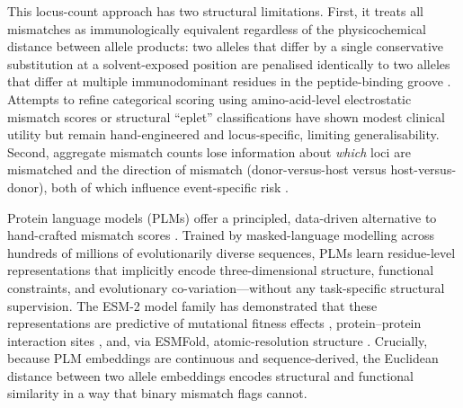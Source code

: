 \documentclass[11pt,a4paper]{article}
\begin{document}
This locus-count approach has two structural limitations.  First, it treats
all mismatches as immunologically equivalent regardless of the physicochemical
distance between allele products: two alleles that differ by a single
conservative substitution at a solvent-exposed position are penalised
identically to two alleles that differ at multiple immunodominant residues in
the peptide-binding groove \citep{buhler2016hla, petersdorf2015hladp,
fleischhauer2012hla}.  Attempts to refine categorical scoring using
amino-acid-level electrostatic mismatch scores \citep{spellman2012permissive}
or structural ``eplet'' classifications \citep{dunn2011eplets} have shown
modest clinical utility but remain hand-engineered and locus-specific,
limiting generalisability.  Second, aggregate mismatch counts lose
information about \emph{which} loci are mismatched and the direction of
mismatch (donor-versus-host versus host-versus-donor), both of which influence
event-specific risk \citep{petersdorf2015hladp, fleischhauer2012hla}.

Protein language models (PLMs) offer a principled, data-driven alternative to
hand-crafted mismatch scores \citep{rives2021esm1, lin2023esm2,
elnaggar2021prottrans}.  Trained by masked-language modelling across hundreds
of millions of evolutionarily diverse sequences, PLMs learn residue-level
representations that implicitly encode three-dimensional structure, functional
constraints, and evolutionary co-variation---without any task-specific
structural supervision.  The ESM-2 model family has demonstrated that these
representations are predictive of mutational fitness effects
\citep{meier2021esm1v}, protein--protein interaction sites
\citep{rives2021esm1}, and, via ESMFold, atomic-resolution structure
\citep{lin2023esm2}.  Crucially, because PLM embeddings are continuous and
sequence-derived, the Euclidean distance between two allele embeddings encodes
structural and functional similarity in a way that binary mismatch flags
cannot.
\end{document}
